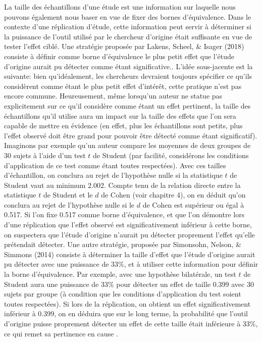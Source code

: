 \documentclass[
  12pt,
  french,
]{article}
\begin{document}
La taille des échantillons d'une étude est une information sur laquelle
nous pouvons également nous baser en vue de fixer des bornes
d'équivalence. Dans le contexte d'une réplication d'étude, cette
information peut servir à déterminer si la puissance de l'outil utilisé
par le chercheur d'origine était suffisante en vue de tester l'effet
ciblé. Une stratégie proposée par Lakens, Scheel, \& Isager (2018)
consiste à définir comme borne d'équivalence le plus petit effet que
l'étude d'origine aurait pu détecter comme étant
significative..
L'idée sous-jacente est la suivante: bien qu'idéalement, les chercheurs
devraient toujours spécifier ce qu'ils considèrent comme étant le plus
petit effet d'intérêt, cette pratique n'est pas encore commune.
Heureusement, même lorsqu'un auteur ne statue pas explicitement sur ce
qu'il considère comme étant un effet pertinent, la taille des
échantillons qu'il utilise aura un impact sur la taille des effets que
l'on sera capable de mettre en évidence (en effet, plus les échantillons
sont petits, plus l'effet observé doit être grand pour pouvoir être
détecté comme étant significatif). Imaginons par exemple qu'un auteur
compare les moyennes de deux groupes de 30 sujets à l'aide d'un test
\(t\) de Student (par facilité, considérons les conditions d'application
de ce test comme étant toutes respectées). Avec ces tailles
d'échantillon, on conclura au rejet de l'hypothèse nulle si la
statistique \(t\) de Student vaut au minimum 2.002. Compte tenu de la
relation directe entre la statistique \(t\) de Student et le \(d\) de
Cohen (voir chapitre 4), on en déduit qu'on conclura au rejet de
l'hypothèse nulle si le \(d\) de Cohen est supérieur ou égal à 0.517. Si
l'on fixe 0.517 comme borne d'équivalence, et que l'on démontre lors
d'une réplication que l'effet observé est significativement inférieur à
cette borne, on suspectera que l'étude d'origine n'aurait pu détecter
proprement l'effet qu'elle prétendait détecter. Une autre stratégie,
proposée par Simonsohn, Nelson, \& Simmons (2014) consiste à déterminer
la taille d'effet que l'étude d'origine aurait pu détecter avec une
puissance de \(33\%\), et à utiliser cette information pour définir la
borne d'équivalence. Par exemple, avec une hypothèse bilatérale, un test
\(t\) de Student aura une puissance de \(33\%\) pour détecter un effet
de taille 0.399 avec 30 sujets par groupe (à condition que les
conditions d'application du test soient toutes respectées). Si lors de
la réplication, on obtient un effet significativement inférieur à 0.399,
on en déduira que sur le long terme, la probabilité que l'outil
d'origine puisse proprement détecter un effet de cette taille était
inférieure à \(33\%\), ce qui remet sa pertinence en cause
.
\end{document}
